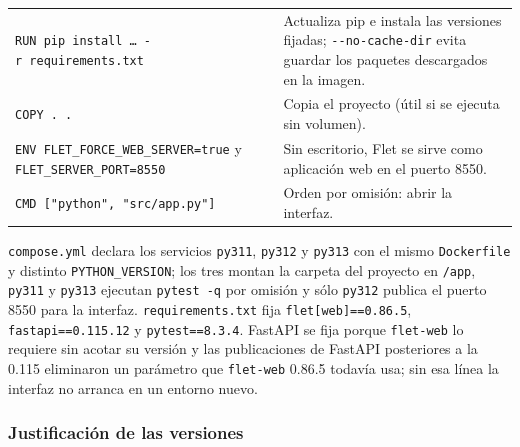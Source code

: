 \begin{longtable}[]{@{}
  >{\raggedright\arraybackslash}p{}
  >{\raggedright\arraybackslash}p{}@{}}
\texttt{RUN\ pip\ install\ …\ -r\ requirements.txt} & Actualiza pip e instala las versiones fijadas; \texttt{-\/-no-cache-dir} evita guardar los paquetes descargados en la imagen. \\
\texttt{COPY\ .\ .} & Copia el proyecto (útil si se ejecuta sin volumen). \\
\texttt{ENV\ FLET\_FORCE\_WEB\_SERVER=true} y \texttt{FLET\_SERVER\_PORT=8550} & Sin escritorio, Flet se sirve como aplicación web en el puerto 8550. \\
\texttt{CMD\ {[}"python",\ "src/app.py"{]}} & Orden por omisión: abrir la interfaz. \\
\end{longtable}

\texttt{compose.yml} declara los servicios \texttt{py311}, \texttt{py312} y \texttt{py313} con el mismo \texttt{Dockerfile} \autocite{composedocs2026} y distinto \texttt{PYTHON\_VERSION}; los tres montan la carpeta del proyecto en \texttt{/app}, \texttt{py311} y \texttt{py313} ejecutan \texttt{pytest\ -q} por omisión y sólo \texttt{py312} publica el puerto 8550 para la interfaz. \texttt{requirements.txt} fija \texttt{flet{[}web{]}==0.86.5}, \texttt{fastapi==0.115.12} y \texttt{pytest==8.3.4}. FastAPI se fija porque \texttt{flet-web} lo requiere sin acotar su versión y las publicaciones de FastAPI posteriores a la 0.115 eliminaron un parámetro que \texttt{flet-web} 0.86.5 todavía usa; sin esa línea la interfaz no arranca en un entorno nuevo.

\hypertarget{justificaciuxf3n-de-las-versiones}{%
\subsubsection{Justificación de las versiones}\label{justificaciuxf3n-de-las-versiones}}

